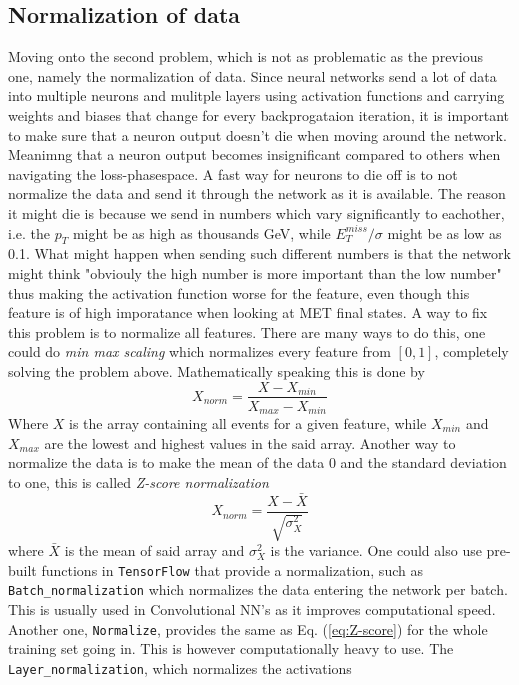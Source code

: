 \documentclass[14pt, a4paper]{book}
\begin{document}
\subsection{Normalization of data}\label{sec:normie_NN}
Moving onto the second problem, which is not as problematic as the previous one, namely the normalization of data. Since neural networks send a lot of data into multiple neurons and mulitple layers using activation functions and carrying weights and biases that change 
for every backprogataion iteration, it is important to make sure that a neuron output doesn't die when moving around the network. Meanimng that a neuron output becomes insignificant compared to others when navigating the loss-phasespace.
A fast way for neurons to die off is to not normalize the data and send it through the network as it is available. The reason it might die is because we send in numbers which vary significantly to eachother, i.e. the $p_{T}$ might be as high as thousands GeV, while 
$E_T^{miss}/\sigma$ might be as low as 0.1. What might happen when sending such different numbers is that the network might think "obviouly the high number is more important than the low number" thus making the activation function worse for the feature, even though 
this feature is of high imporatance when looking at MET final states. A way to fix this problem is to normalize all features. There are many ways to do this, one could do \textit{min max scaling} which normalizes every feature from $[0,1]$, completely solving the problem above. 
Mathematically speaking this is done by
\begin{equation}\label{eq:minmax}
   X_{norm} = \frac{X - X_{min}}{X_{max}-X_{min}}
\end{equation}
Where $X$ is the array containing all events for a given feature, while $X_{min}$ and $X_{max}$ are the lowest and highest values in the said array. Another way to normalize the data is to make the mean of the data 0 and the standard deviation to one, this is called \textit{Z-score normalization}
\begin{equation}\label{eq:Z-score}
   X_{norm} = \frac{X - \bar{X}}{\sqrt{\sigma_X^2}}
\end{equation}
where $\bar{X}$ is the mean of said array and $\sigma_X^2$ is the variance. One could also use pre-built functions in \verb|TensorFlow| that provide a normalization, such as \verb|Batch_normalization| which normalizes the data entering the network per batch. This is usually used 
in Convolutional NN's as it improves computational speed. Another one, \verb|Normalize|, provides the same as Eq. (\ref{eq:Z-score}) for the whole training set going in. This is however computationally heavy to use. The \verb|Layer_normalization|, which normalizes the activations 
\end{document}
